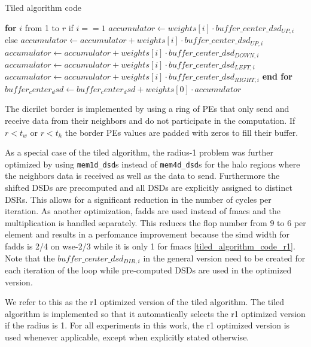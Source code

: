 \documentclass{article}
\begin{document}
\begin{algorithm}
    \caption{Tiled algorithm code}
    \begin{algorithmic}[1]
        \State \textbf{for} $i$ from 1 to $r$
        \State \quad if $i==1$
        \State \quad \quad $accumulator \gets weights[i] \cdot buffer\_center\_dsd_{UP,i}$
        \State \quad else
        \State \quad \quad $accumulator \gets accumulator + weights[i] \cdot buffer\_center\_dsd_{UP,i}$
        \State \quad $accumulator \gets accumulator + weights[i] \cdot buffer\_center\_dsd_{DOWN,i}$
        \State \quad $accumulator \gets accumulator + weights[i] \cdot buffer\_center\_dsd_{LEFT,i}$
        \State \quad $accumulator \gets accumulator + weights[i] \cdot buffer\_center\_dsd_{RIGHT,i}$
        \State \textbf{end for}
        \State \quad $buffer_center_dsd \gets buffer_center_dsd + weights[0] \cdot accumulator$
    \end{algorithmic}
\end{algorithm}

The dicrilet border is implemented by using a ring of PEs that only send and receive data from their neighbors and do not participate in the computation. If $r<t_w$ or $r<t_h$ the border PEs values are padded with zeros to fill their buffer.

As a special case of the tiled algorithm, the radius-1 problem was further optimized by using \texttt{mem1d\_dsd}s instead of \texttt{mem4d\_dsd}s for the halo regions where the neighbors data is received as well as the data to send. Furthermore the shifted DSDs are precomputed and all DSDs are explicitly assigned to distinct DSRs. This allows for a significant reduction in the number of cycles per iteration. As another optimization, fadds are used instead of fmacs and the multiplication is handled separately. This reduces the flop number from $9$ to $6$ per element and results in a perfomance improvement because the simd width for fadds is 2/4 on wse-2/3 while it is only 1 for fmacs \ref{tiled_algorithm_code_r1}. Note that the $buffer\_center\_dsd_{DIR,i}$ in the general version need to be created for each iteration of the loop while pre-computed DSDs are used in the optimized version.

We refer to this as the r1 optimized version of the tiled algorithm.
The tiled algorithm is implemented so that it automatically selects the r1 optimized version if the radius is 1.
For all experiments in this work, the r1 optimized version is used whenever applicable, except when explicitly stated otherwise.
\end{document}

